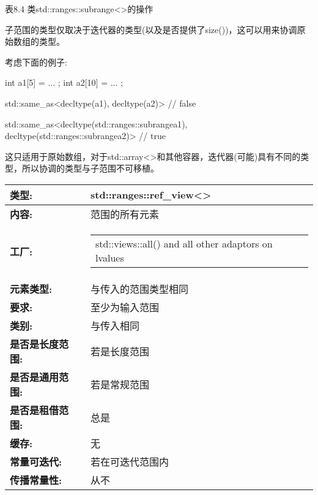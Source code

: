\begin{center}
表8.4 类std::ranges::subrange<>的操作
\end{center}


子范围的类型仅取决于迭代器的类型(以及是否提供了size())，这可以用来协调原始数组的类型。

考虑下面的例子:

\begin{cpp}
int a1[5] = { ... };
int a2[10] = { ... };

std::same_as<decltype(a1), decltype(a2)> // false

std::same_as<decltype(std::ranges::subrange{a1}),
			 decltype(std::ranges::subrange{a2})> // true
\end{cpp}

这只适用于原始数组，对于std::array<>和其他容器，迭代器(可能)具有不同的类型，所以协调的类型与子范围不可移植。


\begin{longtable}[c]{|l|l|}
\hline
\textbf{类型:}                 & std::ranges::ref\_view\textless{}\textgreater{} \\ \hline
\endfirsthead
%
\endhead
%
\textbf{内容:}              & 范围的所有元素   \\ \hline
\textbf{工厂:}      & \begin{tabular}[c]{@{}l@{}}std::views::all() and all other adaptors on lvalues\end{tabular} \\ \hline
\textbf{元素类型:}         & 与传入的范围类型相同                 \\ \hline
\textbf{要求:}             & 至少为输入范围                     \\ \hline
\textbf{类别:}             & 与传入相同                                 \\ \hline
\textbf{是否是长度范围:} & 若是长度范围                                                \\ \hline
\textbf{是否是通用范围:}      & 若是常规范围                         \\ \hline
\textbf{是否是租借范围:}    & 总是                                         \\ \hline
\textbf{缓存:}               & 无                                        \\ \hline
\textbf{常量可迭代:}       & 若在可迭代范围内               \\ \hline
\textbf{传播常量性:} & 从不                                          \\ \hline
\end{longtable}

